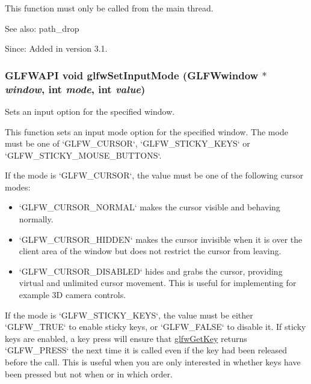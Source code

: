 This function must only be called from the main thread.

\begin{Desc}
\item[See also:]path\_\-drop\end{Desc}
\begin{Desc}
\item[Since:]Added in version 3.1. \end{Desc}
\hypertarget{group__input_ge1eb729d2dd91dc33fd60e150a6e1684}{
\subsubsection[glfwSetInputMode]{\setlength{\rightskip}{0pt plus 5cm}GLFWAPI void glfwSetInputMode ({\bf GLFWwindow} $\ast$ {\em window}, \/  int {\em mode}, \/  int {\em value})}}
\label{group__input_ge1eb729d2dd91dc33fd60e150a6e1684}


Sets an input option for the specified window. 

This function sets an input mode option for the specified window. The mode must be one of `GLFW\_\-CURSOR`, `GLFW\_\-STICKY\_\-KEYS` or `GLFW\_\-STICKY\_\-MOUSE\_\-BUTTONS`.

If the mode is `GLFW\_\-CURSOR`, the value must be one of the following cursor modes:\begin{itemize}
\item `GLFW\_\-CURSOR\_\-NORMAL` makes the cursor visible and behaving normally.\item `GLFW\_\-CURSOR\_\-HIDDEN` makes the cursor invisible when it is over the client area of the window but does not restrict the cursor from leaving.\item `GLFW\_\-CURSOR\_\-DISABLED` hides and grabs the cursor, providing virtual and unlimited cursor movement. This is useful for implementing for example 3D camera controls.\end{itemize}


If the mode is `GLFW\_\-STICKY\_\-KEYS`, the value must be either `GLFW\_\-TRUE` to enable sticky keys, or `GLFW\_\-FALSE` to disable it. If sticky keys are enabled, a key press will ensure that \hyperlink{group__input_g7d8ad8ffaf272808f04e1d5d33ec8859}{glfwGetKey} returns `GLFW\_\-PRESS` the next time it is called even if the key had been released before the call. This is useful when you are only interested in whether keys have been pressed but not when or in which order.

